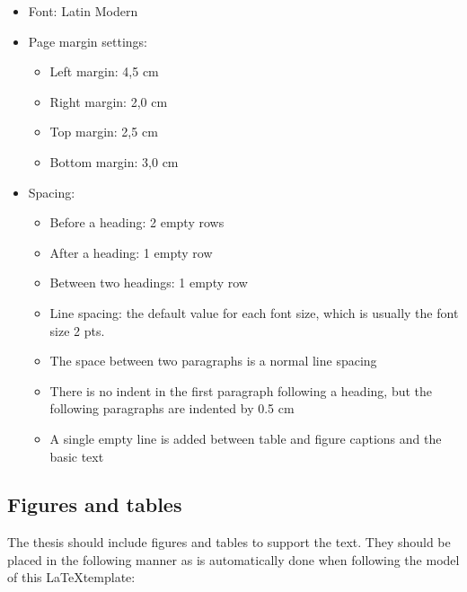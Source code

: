 \begin{itemize}
    \setlength\itemsep{0pt}
    \setlength\parskip{0pt}
    \item Font: Latin Modern
    \item Page margin settings:
    \begin{itemize}[wide=0pt]
        \setlength\itemsep{0pt}
        \setlength\parskip{0pt}
        \item Left margin: 4,5 cm
        \item Right margin: 2,0 cm
        \item Top margin: 2,5 cm
        \item Bottom margin: 3,0 cm
    \end{itemize}
    \item Spacing:
    \begin{itemize}[wide=0pt]
        \setlength\itemsep{0pt}
        \setlength\parskip{0pt}
        \item Before a heading: 2 empty rows
        \item After a heading: 1 empty row
        \item Between two headings: 1 empty row
        \item Line spacing: the default value for each font size, which is usually the font size 2 pts.
        \item The space between two paragraphs is a normal line spacing
        \item There is no indent in the first paragraph following a heading, but the following
paragraphs are indented by 0.5 cm
        \item A single empty line is added between table and figure captions and the basic text
    \end{itemize}    
\end{itemize}

\subsection{Figures and tables}
The thesis should include figures and tables to support the text. They should be placed in the following manner as is automatically done when following the model of this \LaTeX template:

